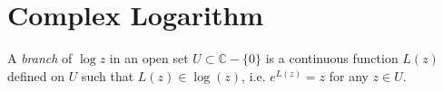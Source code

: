 \section{Complex Logarithm}

\begin{defn}[Branch]
  A \emph{branch} of $\log z$ in an open set
  $U \subset \mathbb{C} - \{ 0 \}$ is a continuous function
  $L(z)$ defined on $U$ such that $L(z) \in \log(z)$, i.e.
  $e^{L(z)} = z$ for any $z \in U$.
\end{defn}
